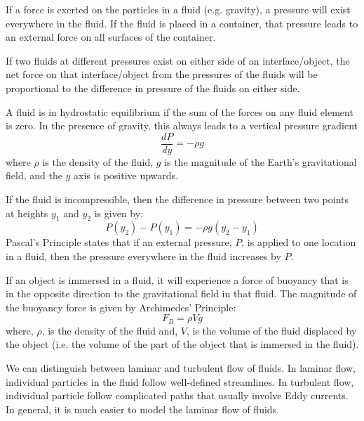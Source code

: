 If a force is exerted on the particles in a fluid (e.g. gravity), a pressure will exist everywhere in the fluid. If the fluid is placed in a container, that pressure leads to an external force on all surfaces of the container.

If two fluids at different pressures exist on either side of an interface/object, the net force on that interface/object from the pressures of the fluids will be proportional to the difference in pressure of the fluids on either side.

A fluid is in hydrostatic equilibrium if the sum of the forces on any fluid element is zero. In the presence of gravity, this always leads to a vertical pressure gradient
\begin{equation}
\frac{dP}{dy}=-\rho g
\end{equation}
where $\rho$ is the density of the fluid, $g$ is the magnitude of the Earth's gravitational field, and the $y$ axis is positive upwards.

If the fluid is incompressible, then the difference in pressure between two points at heights $y_1$ and $y_2$ is given by:
\begin{equation}
P(y_2)-P(y_1) =-\rho g (y_2-y_1)
\end{equation}
Pascal's Principle states that if an external pressure, $P$, is applied to one location in a fluid, then the pressure everywhere in the fluid increases by $P$.

If an object is immersed in a fluid, it will experience a force of buoyancy that is in the opposite direction to the gravitational field in that fluid. The magnitude of the buoyancy force is given by Archimedes' Principle:
\begin{equation}
F_B = \rho Vg
\end{equation}
where, $\rho$, is the density of the fluid and, $V$, is the volume of the fluid displaced by the object (i.e. the volume of the part of the object that is immersed in the fluid).

We can distinguish between laminar and turbulent flow of fluids. In laminar flow, individual particles in the fluid follow well-defined streamlines. In turbulent flow, individual particle follow complicated paths that usually involve Eddy currents. In general, it is much easier to model the laminar flow of fluids.

